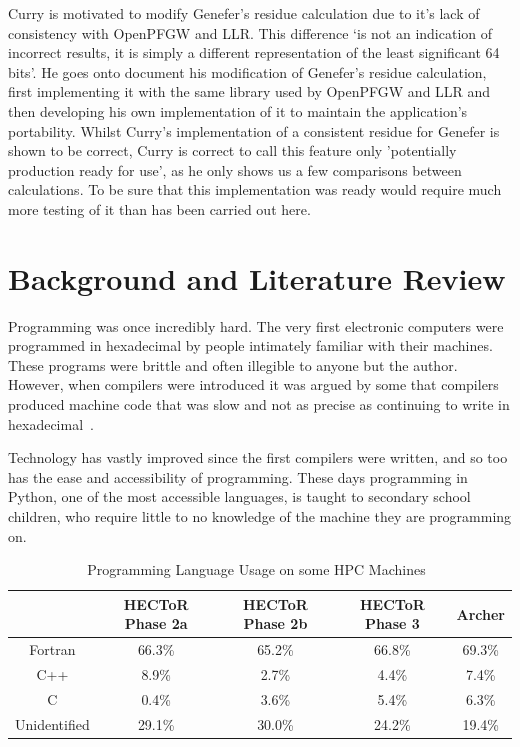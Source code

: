 \documentclass{article}[a4]
\begin{document}
Curry is motivated to modify Genefer's residue calculation due to it's lack of consistency with OpenPFGW and LLR. This difference `is not an indication of incorrect results, it is simply a different representation of the least significant 64 bits'. He goes onto document his modification of Genefer's residue calculation, first implementing it with the same library used by OpenPFGW and LLR and then developing his own implementation of it to maintain the application's portability. Whilst Curry's implementation of a consistent residue for Genefer is shown to be correct, Curry is correct to call this feature only 'potentially production ready for use', as he only shows us a few comparisons between calculations. To be sure that this implementation was ready would require much more testing of it than has been carried out here.

\section{Background and Literature Review} %
Programming was once incredibly hard. The very first electronic computers were programmed in hexadecimal by people intimately familiar with their machines. These programs were brittle and often illegible to anyone but the author. However, when compilers were introduced it was argued by some that compilers produced machine code that was slow and not as precise as continuing to write in hexadecimal~\cite{Jargon}.

Technology has vastly improved since the first compilers were written, and so too has the ease and accessibility of programming. These days programming in Python, one of the most accessible languages, is taught to secondary school children, who require little to no knowledge of the machine they are programming on.

\begin{table}[h]

  \centering
  \label{tab:langs}
  \begin{tabular}{|c|c|c|c|c|}
    \hline
    & \textbf{HECToR Phase 2a} & \textbf{HECToR Phase 2b} & \textbf{HECToR Phase 3} & \textbf{Archer} \\
    \hline
    Fortran & 66.3\% & 65.2\% & 66.8\% & 69.3\% \\
    \hline
    C++ & 8.9\% & 2.7\% & 4.4\% & 7.4\% \\
    \hline
    C & 0.4\% & 3.6\% & 5.4\% & 6.3\% \\
    \hline
    Unidentified & 29.1\% &  30.0\% & 24.2\% & 19.4\% \\
    \hline
  \end{tabular}
  \caption{Programming Language Usage on some HPC Machines~\cite{Turner2015}}
\end{table}
\end{document}

